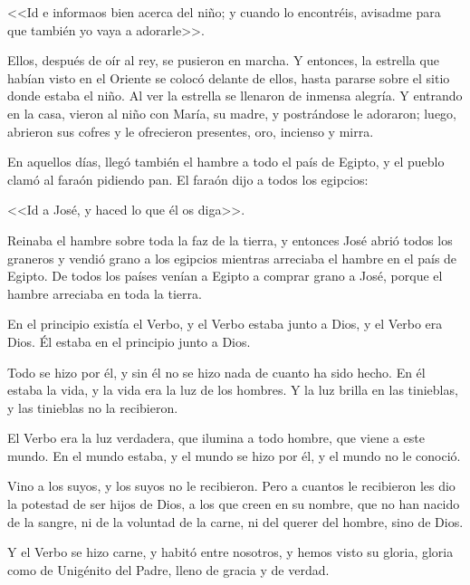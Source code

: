 <<Id e informaos bien acerca del 
niño; y cuando lo encontréis, avisadme para 
que también yo vaya a adorarle>>. 

Ellos, 
después de oír al rey, se pusieron en marcha. Y 
entonces, la estrella que habían visto en el 
Oriente se colocó delante de ellos, hasta 
pararse sobre el sitio donde estaba el niño. Al 
ver la estrella se llenaron de inmensa alegría. Y 
entrando en la casa, vieron al niño con María, 
su madre, y postrándose le adoraron; luego, 
abrieron sus cofres y le ofrecieron presentes, 
oro, incienso y mirra. 





 En aquellos días, llegó también el hambre a 
todo el país de Egipto, y el pueblo clamó al 
faraón pidiendo pan. El faraón dijo a todos los 
egipcios: 

<<Id a José, y haced lo que él os diga>>. 

Reinaba el hambre sobre toda la faz de la 
tierra, y entonces José abrió todos los graneros 
y vendió grano a los egipcios mientras 
arreciaba el hambre en el país de Egipto. De 
todos los países venían a Egipto a comprar 
grano a José, porque el hambre arreciaba en 
toda la tierra. 





 En el principio existía el Verbo, y el Verbo 
estaba junto a Dios, y el Verbo era Dios. Él 
estaba en el principio junto a Dios. 

Todo se 
hizo por él, y sin él no se hizo nada de cuanto 
ha sido hecho. En él estaba la vida, y la vida 
era la luz de los hombres. Y la luz brilla en las 
tinieblas, y las tinieblas no la recibieron.

 El 
Verbo era la luz verdadera, que ilumina a todo 
hombre, que viene a este mundo. En el mundo 
estaba, y el mundo se hizo por él, y el mundo 
no le conoció. 

Vino a los suyos, y los suyos no 
le recibieron. Pero a cuantos le recibieron les 
dio la potestad de ser hijos de Dios, a los que 
creen en su nombre, que no han nacido de la 
sangre, ni de la voluntad de la carne, ni del 
querer del hombre, sino de Dios. 

Y el Verbo se 
hizo carne, y habitó entre nosotros, y hemos 
visto su gloria, gloria como de Unigénito del 
Padre, lleno de gracia y de verdad. 

